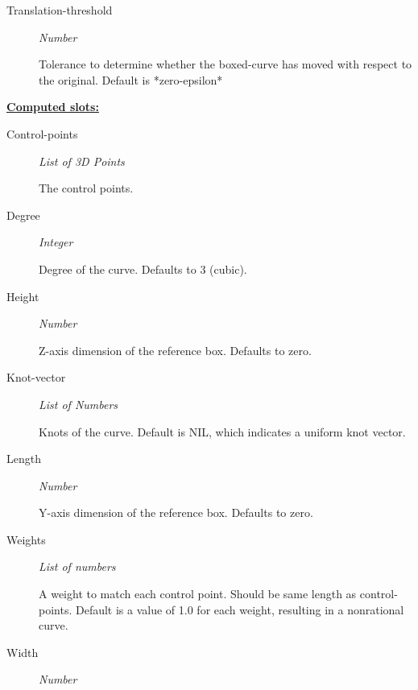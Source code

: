 \documentclass [11pt]{book}
\begin{document}
\begin{itemize}
\begin{description}
\item [Translation-threshold]
\emph{Number}

 Tolerance to determine whether the boxed-curve has
moved with respect to the original. Default is *zero-epsilon*




\end{description}






\textbf{
\underline{Computed slots:}}

\begin{description}

\item [Control-points]
\emph{List of 3D Points}

 The control points.




\item [Degree]
\emph{Integer}

 Degree of the curve. Defaults to 3 (cubic).




\item [Height]
\emph{Number}

 Z-axis dimension of the reference box. Defaults to zero.




\item [Knot-vector]
\emph{List of Numbers}

 Knots of the curve. Default is NIL, which indicates a uniform knot vector.




\item [Length]
\emph{Number}

 Y-axis dimension of the reference box. Defaults to zero.




\item [Weights]
\emph{List of numbers}

 A weight to match each control point. Should be same length as control-points.
Default is a value of 1.0 for each weight, resulting in a nonrational curve.




\item [Width]
\emph{Number}


\end{description}
\end{itemize}
\end{document}
